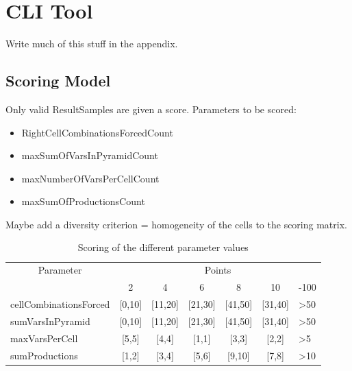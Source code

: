 
\section{CLI Tool}
Write much of this stuff in the appendix.

\subsection{Scoring Model}

Only valid ResultSamples are given a score. Parameters to be scored:
\begin{itemize}
	\item RightCellCombinationsForcedCount
	\item maxSumOfVarsInPyramidCount 	
	\item maxNumberOfVarsPerCellCount
	\item maxSumOfProductionsCount
\end{itemize}

\noindent Maybe add a diversity criterion = homogeneity of the cells to the scoring matrix.

\begin{table}[H]
	\centering
	\begin{tabular}{|l|c|c|c|c|c|l|}
		\hline
		\multicolumn{1}{|c|}{\multirow{2}{*}{Parameter}} & \multicolumn{6}{c|}{Points}                                                          \\ \cline{2-7} 
		\multicolumn{1}{|c|}{}                           & 2          & 4           & 6           & 8           & 10          & -100            \\ \hline
		cellCombinationsForced                           & {[}0,10{]} & {[}11,20{]} & {[}21,30{]} & {[}41,50{]} & {[}31,40{]} & \textgreater 50 \\ \hline
		sumVarsInPyramid                                 & {[}0,10{]} & {[}11,20{]} & {[}21,30{]} & {[}41,50{]} & {[}31,40{]} & \textgreater 50 \\ \hline
		maxVarsPerCell                                   & {[}5,5{]}  & {[}4,4{]}   & {[}1,1{]}   & {[}3,3{]}   & {[}2,2{]}   & \textgreater 5  \\ \hline
		sumProductions                                   & {[}1,2{]}  & {[}3,4{]}   & {[}5,6{]}   & {[}9,10{]}  & {[}7,8{]}   & \textgreater 10 \\ \hline
	\end{tabular}
	\caption{Scoring of the different parameter values}
	\label{scoring}
\end{table}



